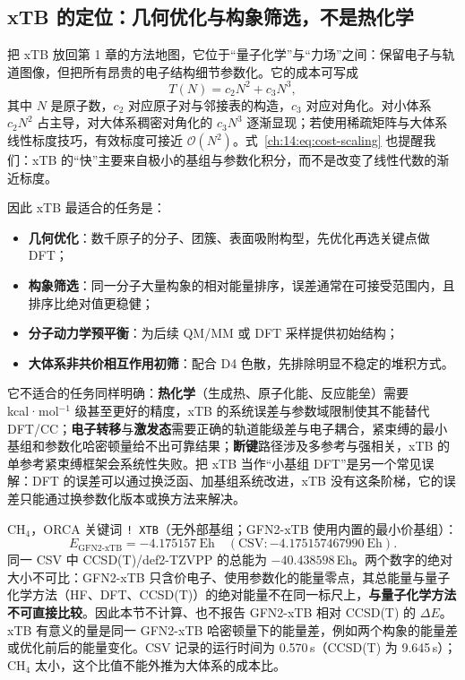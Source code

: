\subsection{xTB 的定位：几何优化与构象筛选，不是热化学}
\label{ch:14:sec:positioning}

把 xTB 放回第 1 章的方法地图，它位于“量子化学”与“力场”之间：保留电子与轨道图像，但把所有昂贵的电子结构细节参数化。它的成本可写成
\begin{equation}
T(N) = c_2 N^2 + c_3 N^3,
\label{ch:14:eq:cost-scaling}
\end{equation}
其中 $N$ 是原子数，$c_2$ 对应原子对与邻接表的构造，$c_3$ 对应对角化。对小体系 $c_2N^2$ 占主导，对大体系稠密对角化的 $c_3N^3$ 逐渐显现；若使用稀疏矩阵与大体系线性标度技巧，有效标度可接近 $\mathcal{O}(N^2)$。式~\eqref{ch:14:eq:cost-scaling} 也提醒我们：xTB 的“快”主要来自极小的基组与参数化积分，而不是改变了线性代数的渐近标度。

因此 xTB 最适合的任务是：
\begin{itemize}
  \item \textbf{几何优化}：数千原子的分子、团簇、表面吸附构型，先优化再选关键点做 DFT；
  \item \textbf{构象筛选}：同一分子大量构象的相对能量排序，误差通常在可接受范围内，且排序比绝对值更稳健；
  \item \textbf{分子动力学预平衡}：为后续 QM/MM 或 DFT 采样提供初始结构；
  \item \textbf{大体系非共价相互作用初筛}：配合 D4 色散，先排除明显不稳定的堆积方式。
\end{itemize}

它不适合的任务同样明确：\textbf{热化学}（生成热、原子化能、反应能垒）需要 kcal·mol$^{-1}$ 级甚至更好的精度，xTB 的系统误差与参数域限制使其不能替代 DFT/CC；\textbf{电子转移}与\textbf{激发态}需要正确的轨道能级差与电子耦合，紧束缚的最小基组和参数化哈密顿量给不出可靠结果；\textbf{断键}路径涉及多参考与强相关，xTB 的单参考紧束缚框架会系统性失败。把 xTB 当作“小基组 DFT”是另一个常见误解：DFT 的误差可以通过换泛函、加基组系统改进，xTB 没有这条阶梯，它的误差只能通过换参数化版本或换方法来解决。

\begin{ch4box}
CH$_4$，ORCA 关键词 \texttt{! XTB}（无外部基组；GFN2-xTB 使用内置的最小价基组）：
\[
E_{\text{GFN2-xTB}} = -4.175157\ \mathrm{Eh}
\quad(\text{CSV}: -4.175157467990\ \mathrm{Eh}).
\]
同一 CSV 中 CCSD(T)/def2-TZVPP 的总能为 $-40.438598$\,Eh。两个数字的绝对大小不可比：GFN2-xTB 只含价电子、使用参数化的能量零点，其总能量与量子化学方法（HF、DFT、CCSD(T)）的绝对能量不在同一标尺上，\textbf{与量子化学方法不可直接比较}。因此本节不计算、也不报告 GFN2-xTB 相对 CCSD(T) 的 $\Delta E$。xTB 有意义的量是同一 GFN2-xTB 哈密顿量下的能量差，例如两个构象的能量差或优化前后的能量变化。CSV 记录的运行时间为 0.570\,s（CCSD(T) 为 9.645\,s）；CH$_4$ 太小，这个比值不能外推为大体系的成本比。
\end{ch4box}

